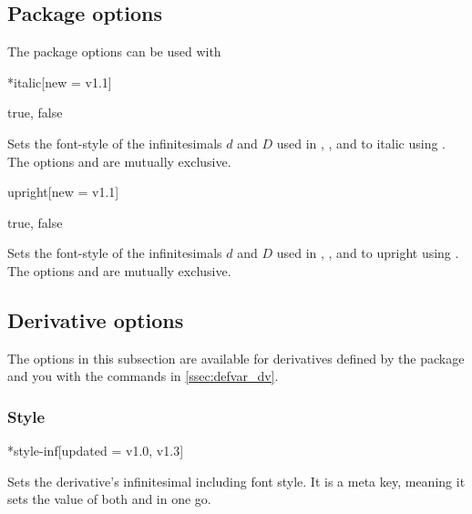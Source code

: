 \subsection{Package options}
The package options can be used with
\begin{center}
	\ttfamily\small
\end{center}

\begin{option}*{italic}[new = v1.1]
	\begin{values}[default = false]
		true, false
	\end{values}
	Sets the font-style of the infinitesimals $d$ and $D$ used in , ,  and  to italic using . The options  and  are mutually exclusive.
\end{option}

\begin{option}{upright}[new = v1.1]
	\begin{values}[default = true]
		true, false
	\end{values}
	Sets the font-style of the infinitesimals $d$ and $D$ used in , ,  and  to upright using . The options  and  are mutually exclusive.
\end{option}

\subsection{Derivative options} \label{ssec:options_dv}
The options in this subsection are available for derivatives defined by the package and you with the commands in \cref{ssec:defvar_dv}.

\subsubsection*{Style}

\begin{option}*{style-inf}[updated = {v1.0, v1.3}]
	\begin{values}[default = d]
	\end{values}
	Sets the derivative's infinitesimal including font style. It is a meta key, meaning it sets the value of both  and  in one go.
	\begin{example}
	\end{example}
\end{option}

